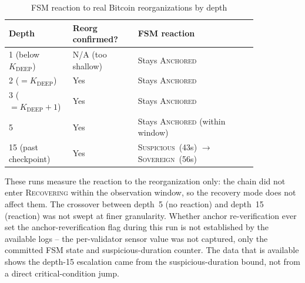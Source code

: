 \begin{table}[tbp]
\caption{FSM reaction to real Bitcoin reorganizations by depth}
\label{tab:reorg}
\centering
\scriptsize
\begin{tabular}{@{}p{0.16\linewidth}p{0.24\linewidth}p{0.44\linewidth}@{}}
\toprule
\textbf{Depth} & \textbf{Reorg confirmed?} & \textbf{FSM reaction} \\
\midrule
1 (below $K_{\text{DEEP}}$) & N/A (too shallow) & Stays \textsc{Anchored} \\
2 ($=K_{\text{DEEP}}$)      & Yes & Stays \textsc{Anchored} \\
3 ($=K_{\text{DEEP}}{+}1$)  & Yes & Stays \textsc{Anchored} \\
5                           & Yes & Stays \textsc{Anchored} (within window) \\
15 (past checkpoint)        & Yes & \textsc{Suspicious}~(43s) $\to$ \textsc{Sovereign}~(56s) \\
\bottomrule
\end{tabular}
\end{table}

These runs measure the reaction to the reorganization only: the chain did not
enter \textsc{Recovering} within the observation window, so the recovery mode
does not affect them. The crossover between depth~5 (no reaction) and depth~15 (reaction) was
not swept at finer granularity. Whether anchor re-verification ever set the
anchor-reverification flag during this run is not established by the
available logs -- the per-validator sensor value was not captured, only the
committed FSM state and suspicious-duration counter. The data that is
available shows the depth-15 escalation came from the suspicious-duration
bound, not from a direct critical-condition jump.

\FloatBarrier
